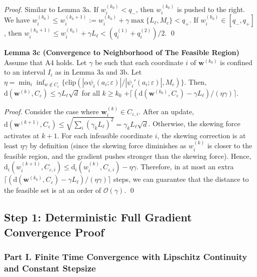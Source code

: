 \documentclass[10pt,a4paper]{article}
\begin{document}
\textit{Proof.} Similar to Lemma 3a. If $w^{(k_0)}_i< q_-$, then $w_i^{(k_0)}$ is pushed to the right. We have $w_i^{(k_0)}\leq w_i^{(k_0+1)}:=w_i^{(k_0)}+\gamma \max\{L_\ell, M_c\}<q_+$. If $w_i^{(k_0)}\in [q_-, q_+]$, then $ w_i^{(k_0+1)}\leq w_i^{(k_0)}+\gamma L_\ell<(q_i^{(1)}+q_i^{(2)})/2$. \qed

\textbf{Lemma 3c (Convergence to Neighborhood of The Feasible Region)} Assume that A4 holds. Let $\gamma$ be such that each coordinate $i$ of $\mathbf{w}^{(k_0)}$ is confined to an interval $I_i$ as in Lemma 3a and 3b. Let $\eta = \min_i\inf_{w\notin C_\varepsilon}\{\text{clip}(|\alpha\psi_i(a_i;\varepsilon)|/|\psi_i'(a_i;\varepsilon)|,M_c)\}$. Then, $\text{d}(\mathbf{w}^{(k)}, C_\varepsilon)\leq \gamma L_\ell \sqrt{d}$ for all $k\geq k_0$ $+ \lceil(\text{d}(\mathbf{w}^{(k_0)}, C_\varepsilon)-\gamma L_\ell)/(\eta\gamma)\rceil$.

\textit{Proof.} Consider the case where $\mathbf{w}^{(k)}_i\in C_{\varepsilon,i}$. After an update, $\text{d}(\mathbf{w}^{(k+1)}, C_\varepsilon) \leq \sqrt{\sum_i (\gamma_k L_\ell)^2} = \gamma_k L_\ell \sqrt{d}$. Otherwise, the skewing force activates at $k+1$. For each infeasible coordinate $i$, the skewing correction is at least $\eta\gamma$ by definition (since the skewing force diminishes as $w_i^{(k)}$ is closer to the feasible region, and the gradient pushes stronger than the skewing force). Hence, $\text{d}_i(w_i^{(k+1)}, C_{\varepsilon, i})\leq \text{d}_i(w_i^{(k)}, C_{\varepsilon, i})-\eta\gamma$. Therefore, in at most an extra $\lceil(\text{d}(\mathbf{w}^{(k_0)}, C_\varepsilon)-\gamma L_\ell)/(\eta\gamma)\rceil$ steps, we can guarantee that the distance to the feasible set is at an order of $\mathcal{O}(\gamma)$. \qed

\subsection{Step 1: Deterministic Full Gradient Convergence Proof}

\subsubsection{Part I. Finite Time Convergence with Lipschitz Continuity and Constant Stepsize}\hfill\\
\end{document}
